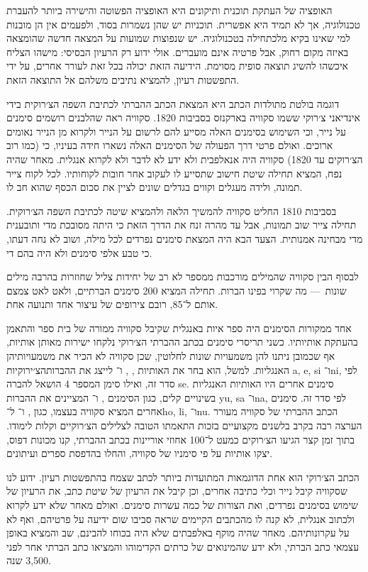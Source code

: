 האופציה של העתקת תוכנית ותיקונים היא האופציה הפשוטה והישירה ביותר להעברת טכנולוגיה, אך לא תמיד היא אפשרית. תוכניות יש שהן נשמרות בסוד, ולפעמים אין הן מובנות למי שאינו בקיא מלכתחילה בטכנולוגיה. יש שנפוצות שמועות על המצאה חדשה שהומצאה באיזה מקום רחוק, אבל פרטיה אינם מועברים. אולי ידוע רק הרעיון הבסיסי: מישהו הצליח איכשהו להשיג תוצאה סופית מסוימת. הידיעה הזאת יכולה בכל זאת לעורר אחרים, על ידי התפשטות רעיון, להמציא נתיבים משלהם אל התוצאה הזאת.

דוגמה בולטת מתולדות הכתב היא המצאת הכתב ההברתי לכתיבת השפה הצ׳רוקית בידי אינדיאני צ׳רוקי ששמו סקוויה בארקנזס בסביבות 1820. סקוויה ראה שהלבנים רושמים סימנים על נייר, וכי השימוש בסימנים האלה מסייע להם לרשום על הנייר ולקרוא מן הנייר נאומים ארוכים. ואולם פרטי דרך הפעולה של הסימנים האלה נשארו חידה בעיניו, כי (כמו רוב הצ׳רוקים עד 1820) סקוויה היה אנאלפבית ולא ידע לא לדבר ולא לקרוא אנגלית. מאחר שהיה נפח, המציא תחילה שיטת חישוב שתסייע לו לעקוב אחר חובות לקוחותיו. לכל לקוח צייר תמונה, ולידה מעגלים וקווים בגדלים שונים לציין את סכום הכסף שהוא חב לו.

בסביבות 1810 החליט סקוויה להמשיך הלאה ולהמציא שיטה לכתיבת השפה הצ׳רוקית. תחילה צייר שוב תמונות, אבל עד מהרה זנח את הדרך הזאת כי היתה מסובכת מדי ותובענית מדי מבחינה אמנותית. הצעד הבא היה המצאת סימנים נפרדים לכל מילה, ושוב לא נחה דעתו, כי טבע אלפי סימנים ולא היה בהם די.

לבסוף הבין סקוויה שהמילים מורכבות ממספר לא רב של יחידות צליל שחוזרות בהרבה מילים שונות~— מה שקרוי בפינו הברות. תחילה המציא 200 סימנים הברתיים, ולאט לאט צמצם אותם ל־85, רובם צירופים של עיצור אחד ותנועה אחת.

אחד ממקורות הסימנים היה ספר איות באנגלית שקיבל סקוויה ממורה של בית ספר והתאמן בהעתקת אותיותיו. כשני תריסרי סימנים בכתב ההברתי הצ׳רוקי נלקחו ישירות מאותן אותיות, אף שכמובן ניתנו להן משמעויות שונות לחלוטין, שכן סקוויה לא הכיר את משמעויותיהן האנגליות. למשל, הוא בחר את האותיות , ,  ו־ לייצג את ההברותהצ׳ירוקיות a, e, si ו־ni, לפי סדר זה, ואילו סימן המספר 4 הושאל להברה se. סימנים אחרים היו האותיות האנגליות בשינויים קלים, כגון הסימנים ,  ו־ המציינים את ההברות yu, sa ו־na, לפי סדר זה. סימנים אחרים המציא סקוויה בעצמו, כגון ,  ו־ ל־ho, li, ו־nu. הכתב ההברתי של סקוויה מעורר הערצה רבה בקרב בלשנים מקצועיים בזכות התאמתו הטובה לצלילים הצ׳רוקיים וקלות לימודו. בתוך זמן קצר הגיעו הצ׳רוקים כמעט ל־100 אחוזי אוריינות בכתב ההברתי, קנו מכונות דפוס, יצקו אותיות על פי סימניו של סקוויה, והחלו בהדפסת ספרים ועיתונים.

הכתב הצ׳רוקי הוא אחת הדוגמאות המתועדות ביותר לכתב שצמח בהתפשטות רעיון. ידוע לנו שסקוויה קיבל נייר וכלי כתיבה אחרים, וכן קיבל את הרעיון של שיטת כתב, את הרעיון של שימוש בסימנים נפרדים, ואת הצורות של כמה עשרות סימנים. ואולם מאחר שלא ידע לקרוא ולכתוב אנגלית, לא קנה לו מהכתבים הקיימים שראה סביבו שום ידיעה על פרטיהם, ואף לא על עקרונותיהם. מאחר שהיה מוקף באלפבתים שלא היה בכוחו להבינם, שב והמציא באופן עצמאי כתב הברתי, ולא ידע שהמינואים של כרתים הקדימוהו והמציאו כתב הברתי אחר לפני 3,500 שנה.

